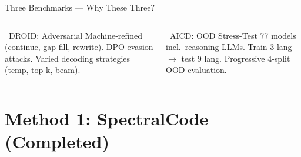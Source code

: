 \documentclass[aspectratio=169, 10pt]{beamer}
\begin{document}
\begin{frame}{Three Benchmarks --- Why These Three?}
\begin{columns}[T]
\begin{exampleblock}{\scriptsize \faStar\ DROID: Adversarial}
\scriptsize
Machine-refined (continue, gap-fill, rewrite). DPO evasion attacks. Varied decoding strategies (temp, top-k, beam).
\end{exampleblock}

\begin{exampleblock}{\scriptsize \faStar\ AICD: OOD Stress-Test}
\scriptsize
77 models incl.\ reasoning LLMs. Train 3 lang $\to$ test 9 lang. Progressive 4-split OOD evaluation.
\end{exampleblock}
\end{columns}
\end{frame}


\section{Method 1: SpectralCode (Completed)}
\end{document}
